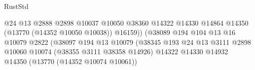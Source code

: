 \begin{lexlean}{RustStd}
\begin{coremodule}
                                                              @24
                                                              @13
                                                              @2888
                                                              @2898
                                                              @10037
                                                              @10050
                                                              @38360
                                                              @14322
                                                              @14330
                                                              @14864
                                                              @14350
                                                              (@13770 (@14352 @10050 @10038))
                                                              @16159))
                                                          (@38089
                                                            @194
                                                            @104
                                                            @13
                                                            @16
                                                            @10079
                                                            @2822
                                                            (@38097
                                                              @194
                                                              @13
                                                              @10079
                                                              (@38345
                                                                @193
                                                                @24
                                                                @13
                                                                @3111
                                                                @2898
                                                                @10060
                                                                @10074
                                                                (@38355 @3111 @38358 @14926)
                                                                @14322
                                                                @14330
                                                                @14932
                                                                @14350
                                                                (@13770 (@14352 @10074 @10061))

\end{coremodule}
\end{lexlean}
